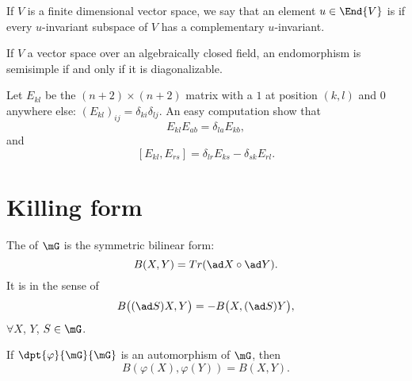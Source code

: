 \begin{definition}
    If $V$ is a finite dimensional vector space, we say that an element $u\in\End{V}$ is \label{pg:def_semisimple} if every \( u\)-invariant subspace of \( V\) has a complementary \( u\)-invariant.
\end{definition}

\begin{proposition}
    If \( V\) a vector space over an algebraically closed field, an endomorphism is semisimple if and only if it is diagonalizable.
\end{proposition}

\label{pg:E_ij}Let $E_{kl}$ be the $(n+2)\times(n+2)$ matrix with a $1$ at position $(k,l)$ and $0$ anywhere else: $(E_{kl})_{ij}=\delta_{ki}\delta_{lj}$. An easy computation show that 
\begin{equation}        \label{EqFormMulEmtr}       %
    E_{kl}E_{ab}=\delta_{la}E_{kb},
\end{equation}
and
\begin{equation}\label{comm_de_E}
    [E_{kl},E_{rs}]=\delta_{lr}E_{ks}-\delta_{sk}E_{rl}.
\end{equation}

\section{Killing form}

The  of $\mG$ is the symmetric bilinear form:
\begin{equation}
             B(X,Y)=Tr(\ad X\circ \ad Y).
\end{equation}
It is  in the sense of
\begin{equation}                        \label{eq:Killing_invariant}
     B\big((\ad S)X,Y\big)=-B\big(X,(\ad S)Y\big),
\end{equation}
$\forall X$, $Y$, $S\in\mG$.

\begin{proposition} \label{PropAutomInvarB}
If $\dpt{\varphi}{\mG}{\mG}$ is an automorphism of $\mG$, then 
\[
   B(\varphi(X),\varphi(Y))=B(X,Y).
\]
\label{prop:auto_2}
\end{proposition}
 
